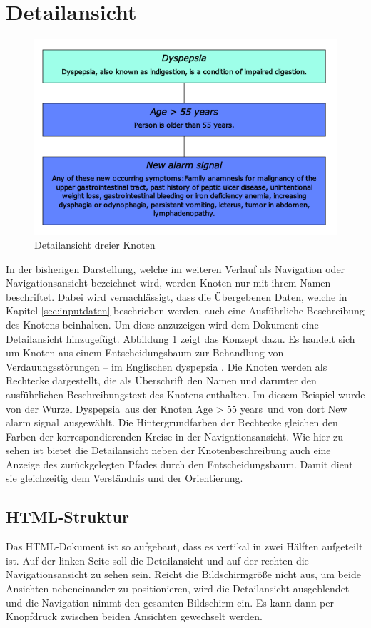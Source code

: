 \section{Detailansicht}\label{sec:detailansicht}
\begin{figure}
	\centering
	\includegraphics[width=.9\linewidth]{../screenshots/detailansicht.PNG}
	\caption{Detailansicht dreier Knoten}
	\label{abb:detailansicht}
\end{figure}
In der bisherigen Darstellung, welche im weiteren Verlauf als Navigation oder Navigationsansicht bezeichnet wird, werden Knoten nur mit ihrem Namen beschriftet. Dabei wird vernachlässigt, dass die Übergebenen Daten, welche in Kapitel \ref{sec:inputdaten} beschrieben werden, auch eine Ausführliche Beschreibung des Knotens beinhalten. Um diese anzuzeigen wird dem Dokument eine Detailansicht hinzugefügt. Abbildung \ref{abb:detailansicht} zeigt das Konzept dazu. Es handelt sich um Knoten aus einem Entscheidungsbaum zur Behandlung von Verdauungsstörungen -- im Englischen \glqq dyspepsia \grqq . Die Knoten werden als Rechtecke dargestellt, die als Überschrift den Namen und darunter den ausführlichen Beschreibungstext des Knotens enthalten. Im diesem Beispiel wurde von der Wurzel \glqq Dyspepsia\grqq\ aus der Knoten \glqq Age > 55 years\grqq\ und von dort \glqq New alarm signal\grqq\ ausgewählt. Die Hintergrundfarben der Rechtecke gleichen den Farben der korrespondierenden Kreise in der Navigationsansicht. Wie hier zu sehen ist bietet die Detailansicht neben der Knotenbeschreibung auch eine Anzeige des zurückgelegten Pfades durch den Entscheidungsbaum. Damit dient sie gleichzeitig dem Verständnis und der Orientierung. 

\subsection{HTML-Struktur}
Das HTML-Dokument ist so aufgebaut, dass es vertikal in zwei Hälften aufgeteilt ist. Auf der linken Seite soll die Detailansicht und auf der rechten die Navigationsansicht zu sehen sein. Reicht die Bildschirmgröße nicht aus, um beide Ansichten nebeneinander zu positionieren, wird die Detailansicht ausgeblendet und die Navigation nimmt den gesamten Bildschirm ein. Es kann dann per Knopfdruck zwischen beiden Ansichten gewechselt werden.

